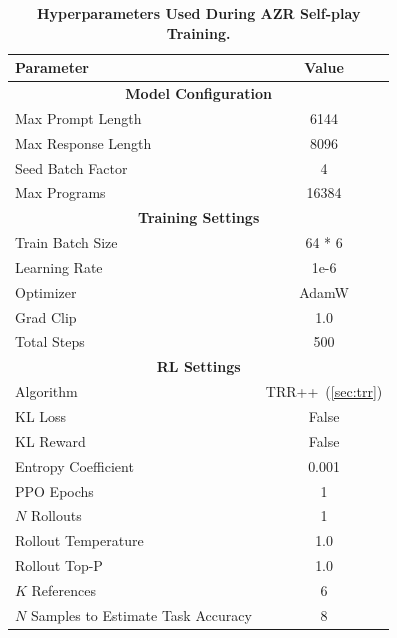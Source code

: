 \documentclass{article}
\begin{document}
\begin{table}[ht]
\centering
\begin{tabular}{|l|c|}
\hline
\textbf{Parameter}                  & \textbf{Value}          \\ \hline
\multicolumn{2}{|c|}{\textbf{Model Configuration}}  \\ \hline
Max Prompt Length                   & 6144                    \\ \hline
Max Response Length                 & 8096                    \\ \hline
Seed Batch Factor                   & 4                       \\ \hline
Max Programs                         & 16384                   \\ \hline
\multicolumn{2}{|c|}{\textbf{Training Settings}} \\ \hline
Train Batch Size                    & 64 * 6                  \\ \hline
Learning Rate                        & 1e-6                    \\ \hline
Optimizer                  & AdamW                   \\ \hline
Grad Clip                            & 1.0                     \\ \hline
Total Steps                          & 500                     \\ \hline
\multicolumn{2}{|c|}{\textbf{RL Settings}} \\ \hline
Algorithm                           & TRR++~(\cref{sec:trr})                   \\ \hline
KL Loss                              & False                   \\ \hline
KL Reward                            & False                   \\ \hline
Entropy Coefficient                  & 0.001                   \\ \hline
PPO Epochs                           & 1                       \\ \hline
$N$ Rollouts                           & 1                       \\ \hline
Rollout Temperature                  & 1.0                     \\ \hline
Rollout Top-P                         & 1.0                     \\ \hline
$K$ References                         & 6                       \\ \hline
$N$ Samples to Estimate Task Accuracy       & 8                       \\ \hline
\end{tabular}
\caption{\textbf{Hyperparameters Used During AZR Self-play Training.}}
\label{tab:hypers}
\end{table}
\end{document}
